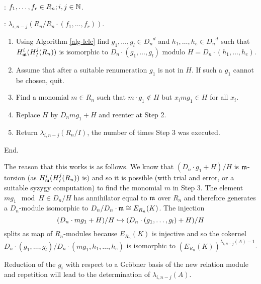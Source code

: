 \begin{alg}~

: $f_1,\ldots,f_r\in R_n; i,j\in {\mathbb N}$.

: $\lambda_{i,n-j}(R_n/R_n\cdot(f_1,\ldots,f_r))$.

\begin{enumerate}
\item Using Algorithm \ref{alg-lclc} find $g_1,\ldots,g_l\in {D_n}^d$
and $h_1,\ldots,h_e\in {D_n}^d$ such that $H^i_{\mathfrak m}(H^j_I(R_n))$ is
isomorphic to $D_n\cdot (g_1,\ldots,g_l)$ modulo $H=D_n\cdot (h_1,\ldots,h_e)$.
\item Assume that after a suitable renumeration 
$g_1$ is not in $H$. If such a $g_1$ cannot be
chosen, quit. 
\item Find a monomial $m\in R_n$ such that $m\cdot g_1\not\in H$ but
$x_img_1\in H$ for all $x_i$.
\item Replace $H$ by $D_nmg_1+H$ and reenter at Step 2.
\item Return $\lambda_{i,n-j}(R_n/I)$, the number of times Step 3 was
executed. 
\end{enumerate}
End.
\end{alg}
The reason that this works is as follows.
We know that
$(D_n\cdot g_1+H)/H$ is ${\mathfrak m}$-torsion (as $H^i_{\mathfrak m}(H^j_I(R_n))$ is) 
and so it is possible (with trial
and error, or a suitable syzygy computation) 
to find the monomial $m$ in Step 3.
The element $mg_1 \mod H\in D_n/H$ has annihilator equal
to ${\mathfrak m}$ over $R_n$ and therefore generates a $D_n$-module isomorphic to
$D_n/D_n\cdot {\mathfrak m}\cong E_{R_n}(K)$. The injection 
\[
(D_n\cdot mg_1+H)/H\hookrightarrow
(D_n\cdot(g_1,\ldots,g_l)+H)/H
\]
splits as map of $R_n$-modules because $E_{R_n}(K)$ is  
injective and so the cokernel 
$D_n\cdot (g_1,\ldots,g_l)/D_n\cdot (mg_1,h_1,\ldots,h_e)$ is isomorphic to
$(E_{R_n}(K))^{\lambda_{i,n-j}(A)-1}$. 

Reduction of the $g_i$ with respect to a Gr\"obner basis of the new
relation module and repetition will lead to
the determination of $\lambda_{i,n-j}(A)$.
%

